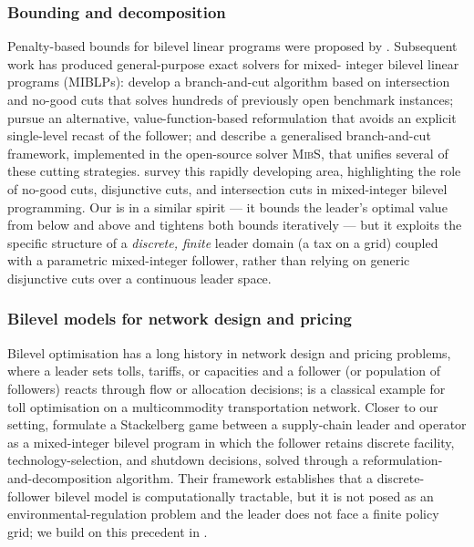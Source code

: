 \subsubsection{Bounding and decomposition}
\label{sec:lit:bounding}

Penalty-based bounds for
bilevel linear programs were proposed by \citet{edmunds1991}.
Subsequent work has produced general-purpose exact solvers for mixed-
integer bilevel linear programs (MIBLPs): \citet{fischetti2017}
develop a branch-and-cut algorithm based on intersection and no-good
cuts that solves hundreds of previously open benchmark instances;
\citet{lozanosmith2017} pursue an alternative, value-function-based
reformulation that avoids an explicit single-level recast of the
follower; and \citet{tahernejad2020} describe a generalised
branch-and-cut framework, implemented in the open-source solver
\textsc{MibS}, that unifies several of these cutting strategies.
\citet{kleinert2021} survey this rapidly developing area,
highlighting the role of no-good cuts, disjunctive cuts, and
intersection cuts in mixed-integer bilevel programming. Our \DBP is
in a similar spirit --- it bounds the leader's optimal value from
below and above and tightens both bounds iteratively --- but it
exploits the specific structure of a \emph{discrete, finite} leader
domain (a tax on a grid) coupled with a parametric mixed-integer
follower, rather than relying on generic disjunctive cuts over a
continuous leader space.

\subsubsection{Bilevel models for network design and pricing}
\label{sec:lit:bilevel_network}

Bilevel optimisation has a long history in network design and
pricing problems, where a leader sets tolls, tariffs, or capacities
and a follower (or population of followers) reacts through flow or
allocation decisions; \citet{brotcorne2001} is a classical example
for toll optimisation on a multicommodity transportation network.
Closer to our setting, \citet{yueyou2017} formulate a Stackelberg
game between a supply-chain leader and operator as a mixed-integer
bilevel program in which the follower retains discrete facility,
technology-selection, and shutdown decisions, solved through a
reformulation-and-decomposition algorithm. Their framework establishes
that a discrete-follower bilevel \SCND model is computationally
tractable, but it is not posed as an environmental-regulation problem
and the leader does not face a finite policy grid; we build on this
precedent in .

